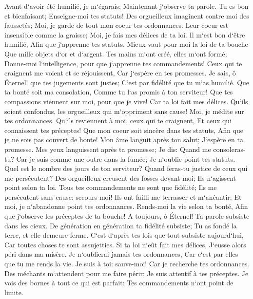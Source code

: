 \verse Avant d`avoir été humilié, je m`égarais; Maintenant j`observe ta parole. 
\verse Tu es bon et bienfaisant; Enseigne-moi tes statuts! 
\verse Des orgueilleux imaginent contre moi des faussetés; Moi, je garde de tout mon coeur tes ordonnances. 
\verse Leur coeur est insensible comme la graisse; Moi, je fais mes délices de ta loi. 
\verse Il m`est bon d`être humilié, Afin que j`apprenne tes statuts. 
\verse Mieux vaut pour moi la loi de ta bouche Que mille objets d`or et d`argent. 
\verse Tes mains m`ont créé, elles m`ont formé; Donne-moi l`intelligence, pour que j`apprenne tes commandements! 
\verse Ceux qui te craignent me voient et se réjouissent, Car j`espère en tes promesses. 
\verse Je sais, ô Éternel! que tes jugements sont justes; C`est par fidélité que tu m`as humilié. 
\verse Que ta bonté soit ma consolation, Comme tu l`as promis à ton serviteur! 
\verse Que tes compassions viennent sur moi, pour que je vive! Car ta loi fait mes délices. 
\verse Qu`ils soient confondus, les orgueilleux qui m`oppriment sans cause! Moi, je médite sur tes ordonnances. 
\verse Qu`ils reviennent à moi, ceux qui te craignent, Et ceux qui connaissent tes préceptes! 
\verse Que mon coeur soit sincère dans tes statuts, Afin que je ne sois pas couvert de honte! 
\verse Mon âme languit après ton salut; J`espère en ta promesse. 
\verse Mes yeux languissent après ta promesse; Je dis: Quand me consoleras-tu? 
\verse Car je suis comme une outre dans la fumée; Je n`oublie point tes statuts. 
\verse Quel est le nombre des jours de ton serviteur? Quand feras-tu justice de ceux qui me persécutent? 
\verse Des orgueilleux creusent des fosses devant moi; Ils n`agissent point selon ta loi. 
\verse Tous tes commandements ne sont que fidélité; Ils me persécutent sans cause: secours-moi! 
\verse Ils ont failli me terrasser et m`anéantir; Et moi, je n`abandonne point tes ordonnances. 
\verse Rends-moi la vie selon ta bonté, Afin que j`observe les préceptes de ta bouche! 
\verse A toujours, ô Éternel! Ta parole subsiste dans les cieux. 
\verse De génération en génération ta fidélité subsiste; Tu as fondé la terre, et elle demeure ferme. 
\verse C`est d`après tes lois que tout subsiste aujourd`hui, Car toutes choses te sont assujetties. 
\verse Si ta loi n`eût fait mes délices, J`eusse alors péri dans ma misère. 
\verse Je n`oublierai jamais tes ordonnances, Car c`est par elles que tu me rends la vie. 
\verse Je suis à toi: sauve-moi! Car je recherche tes ordonnances. 
\verse Des méchants m`attendent pour me faire périr; Je suis attentif à tes préceptes. 
\verse Je vois des bornes à tout ce qui est parfait: Tes commandements n`ont point de limite. 
